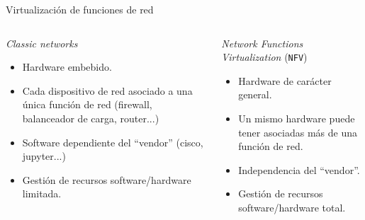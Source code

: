 \documentclass[aspectratio=169,xcolor=dvipsnames]{beamer}
\begin{document}
	\begin{frame}{Virtualización de funciones de red}
	    \begin{columns}
	        \begin{column}{0.5\textwidth}
	        \begin{exampleblock}{\textit{Classic networks}}
	            \begin{itemize}
	                \item Hardware embebido.
	                \item Cada dispositivo de red asociado a una única función de red (firewall, balanceador de carga, router...)
	                \item Software dependiente del ``vendor'' (cisco, jupyter...)
	                \item Gestión de recursos software/hardware limitada.
	            \end{itemize}
	        \end{exampleblock}
	        \end{column}
	        
	        \begin{column}{0.5\textwidth}
	        \begin{exampleblock}{\textit{Network Functions Virtualization} (\texttt{NFV})}
	            \begin{itemize}
	                \item Hardware de carácter general.
	                \item Un mismo hardware puede tener asociadas más de una función de red.
	                \item Independencia del ``vendor''.
	                \item Gestión de recursos software/hardware total.
	            \end{itemize}
	        \end{exampleblock}
	        \end{column}
	    \end{columns}
	\end{frame}
	
\end{document}
